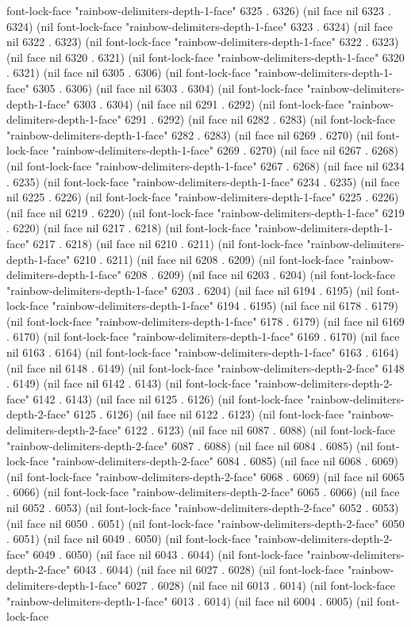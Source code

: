 font-lock-face "rainbow-delimiters-depth-1-face" 6325 . 6326) (nil face nil 6323 . 6324) (nil font-lock-face "rainbow-delimiters-depth-1-face" 6323 . 6324) (nil face nil 6322 . 6323) (nil font-lock-face "rainbow-delimiters-depth-1-face" 6322 . 6323) (nil face nil 6320 . 6321) (nil font-lock-face "rainbow-delimiters-depth-1-face" 6320 . 6321) (nil face nil 6305 . 6306) (nil font-lock-face "rainbow-delimiters-depth-1-face" 6305 . 6306) (nil face nil 6303 . 6304) (nil font-lock-face "rainbow-delimiters-depth-1-face" 6303 . 6304) (nil face nil 6291 . 6292) (nil font-lock-face "rainbow-delimiters-depth-1-face" 6291 . 6292) (nil face nil 6282 . 6283) (nil font-lock-face "rainbow-delimiters-depth-1-face" 6282 . 6283) (nil face nil 6269 . 6270) (nil font-lock-face "rainbow-delimiters-depth-1-face" 6269 . 6270) (nil face nil 6267 . 6268) (nil font-lock-face "rainbow-delimiters-depth-1-face" 6267 . 6268) (nil face nil 6234 . 6235) (nil font-lock-face "rainbow-delimiters-depth-1-face" 6234 . 6235) (nil face nil 6225 . 6226) (nil font-lock-face "rainbow-delimiters-depth-1-face" 6225 . 6226) (nil face nil 6219 . 6220) (nil font-lock-face "rainbow-delimiters-depth-1-face" 6219 . 6220) (nil face nil 6217 . 6218) (nil font-lock-face "rainbow-delimiters-depth-1-face" 6217 . 6218) (nil face nil 6210 . 6211) (nil font-lock-face "rainbow-delimiters-depth-1-face" 6210 . 6211) (nil face nil 6208 . 6209) (nil font-lock-face "rainbow-delimiters-depth-1-face" 6208 . 6209) (nil face nil 6203 . 6204) (nil font-lock-face "rainbow-delimiters-depth-1-face" 6203 . 6204) (nil face nil 6194 . 6195) (nil font-lock-face "rainbow-delimiters-depth-1-face" 6194 . 6195) (nil face nil 6178 . 6179) (nil font-lock-face "rainbow-delimiters-depth-1-face" 6178 . 6179) (nil face nil 6169 . 6170) (nil font-lock-face "rainbow-delimiters-depth-1-face" 6169 . 6170) (nil face nil 6163 . 6164) (nil font-lock-face "rainbow-delimiters-depth-1-face" 6163 . 6164) (nil face nil 6148 . 6149) (nil font-lock-face "rainbow-delimiters-depth-2-face" 6148 . 6149) (nil face nil 6142 . 6143) (nil font-lock-face "rainbow-delimiters-depth-2-face" 6142 . 6143) (nil face nil 6125 . 6126) (nil font-lock-face "rainbow-delimiters-depth-2-face" 6125 . 6126) (nil face nil 6122 . 6123) (nil font-lock-face "rainbow-delimiters-depth-2-face" 6122 . 6123) (nil face nil 6087 . 6088) (nil font-lock-face "rainbow-delimiters-depth-2-face" 6087 . 6088) (nil face nil 6084 . 6085) (nil font-lock-face "rainbow-delimiters-depth-2-face" 6084 . 6085) (nil face nil 6068 . 6069) (nil font-lock-face "rainbow-delimiters-depth-2-face" 6068 . 6069) (nil face nil 6065 . 6066) (nil font-lock-face "rainbow-delimiters-depth-2-face" 6065 . 6066) (nil face nil 6052 . 6053) (nil font-lock-face "rainbow-delimiters-depth-2-face" 6052 . 6053) (nil face nil 6050 . 6051) (nil font-lock-face "rainbow-delimiters-depth-2-face" 6050 . 6051) (nil face nil 6049 . 6050) (nil font-lock-face "rainbow-delimiters-depth-2-face" 6049 . 6050) (nil face nil 6043 . 6044) (nil font-lock-face "rainbow-delimiters-depth-2-face" 6043 . 6044) (nil face nil 6027 . 6028) (nil font-lock-face "rainbow-delimiters-depth-1-face" 6027 . 6028) (nil face nil 6013 . 6014) (nil font-lock-face "rainbow-delimiters-depth-1-face" 6013 . 6014) (nil face nil 6004 . 6005) (nil font-lock-face 